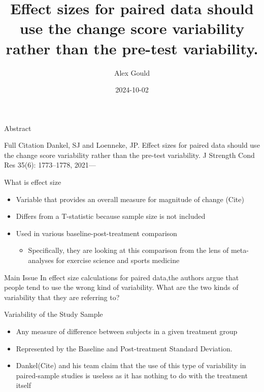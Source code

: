\documentclass[
  ignorenonframetext,
  aspectratio=169,
]{beamer}
\title{Effect sizes for paired data should use the change score
variability rather than the pre-test variability.}
\author{Alex Gould}
\date{2024-10-02}
\providecommand{\tightlist}{%
  \setlength{\itemsep}{0pt}\setlength{\parskip}{0pt}}
\begin{document}
\frame{\titlepage}

\begin{frame}{Abstract}
\protect\hypertarget{abstract}{}
\begin{block}{Full Citation}
\protect\hypertarget{full-citation}{}
Dankel, SJ and Loenneke, JP. Effect sizes for paired data should use the
change score variability rather than the pre-test variability. J
Strength Cond Res 35(6): 1773--1778, 2021---
\end{block}

\begin{block}{What is effect size}
\protect\hypertarget{what-is-effect-size}{}
\begin{itemize}
\tightlist
\item
  Variable that provides an overall measure for magnitude of change
  (Cite)
\item
  Differs from a T-statistic because sample size is not included
\item
  Used in various baseline-post-treatment comparison

  \begin{itemize}
  \tightlist
  \item
    Specifically, they are looking at this comparison from the lens of
    meta-analyses for exercise science and sports medicine
  \end{itemize}
\end{itemize}
\end{block}
\end{frame}

\begin{frame}{Main Issue}
\protect\hypertarget{main-issue}{}
In effect size calculations for paired data,the authors argue that
people tend to use the wrong kind of variability. What are the two kinds
of variability that they are referring to?
\end{frame}

\begin{frame}{Variability of the Study Sample}
\protect\hypertarget{variability-of-the-study-sample}{}
\begin{itemize}
\tightlist
\item
  Any measure of difference between subjects in a given treatment group
\item
  Represented by the Baseline and Post-treatment Standard Deviation.
\item
  Dankel(Cite) and his team claim that the use of this type of
  variability in paired-sample studies is useless as it has nothing to
  do with the treatment itself
\end{itemize}
\end{frame}
\end{document}
